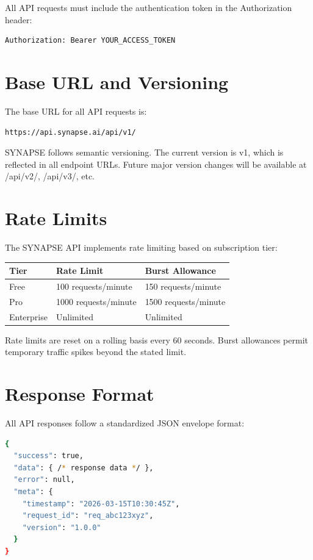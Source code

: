 \documentclass{report}
\begin{document}
All API requests must include the authentication token in the Authorization header:

\begin{lstlisting}[language=bash]
Authorization: Bearer YOUR_ACCESS_TOKEN
\end{lstlisting}

\section{Base URL and Versioning}

The base URL for all API requests is:

\begin{lstlisting}[language=bash]
https://api.synapse.ai/api/v1/
\end{lstlisting}

SYNAPSE follows semantic versioning. The current version is v1, which is reflected in all endpoint URLs. Future major version changes will be available at /api/v2/, /api/v3/, etc.

\section{Rate Limits}

The SYNAPSE API implements rate limiting based on subscription tier:

\begin{center}
\begin{tabular}{lll}
\toprule
\textbf{Tier} & \textbf{Rate Limit} & \textbf{Burst Allowance} \\
\midrule
Free & 100 requests/minute & 150 requests/minute \\
Pro & 1000 requests/minute & 1500 requests/minute \\
Enterprise & Unlimited & Unlimited \\
\bottomrule
\end{tabular}
\end{center}

Rate limits are reset on a rolling basis every 60 seconds. Burst allowances permit temporary traffic spikes beyond the stated limit.

\section{Response Format}

All API responses follow a standardized JSON envelope format:

\begin{lstlisting}[language=bash]
{
  "success": true,
  "data": { /* response data */ },
  "error": null,
  "meta": {
    "timestamp": "2026-03-15T10:30:45Z",
    "request_id": "req_abc123xyz",
    "version": "1.0.0"
  }
}
\end{lstlisting}
\end{document}

